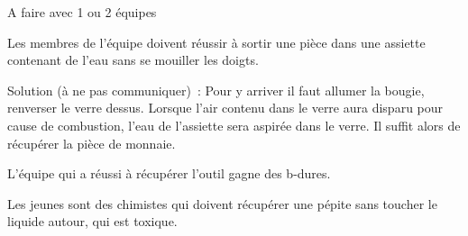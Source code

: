 \documentclass{grand-jeu}
\begin{document}
\begin{liste-materiel}
\end{liste-materiel}

\begin{regles}
A faire avec 1 ou 2 équipes

Les membres de l’équipe doivent réussir à sortir une pièce dans une assiette contenant de l’eau sans se mouiller les doigts.

Solution (à ne pas communiquer) : Pour y arriver il faut allumer la bougie, renverser le verre dessus. Lorsque l’air contenu dans le verre aura disparu pour cause de combustion, l’eau de l’assiette sera aspirée dans le verre. Il suffit alors de récupérer la pièce de monnaie.

L’équipe qui a réussi à récupérer l’outil gagne des b-dures.
\end{regles}

\begin{imaginaire}
Les jeunes sont des chimistes qui doivent récupérer une pépite sans toucher le liquide autour, qui est toxique.
\end{imaginaire}

\begin{moments-stop}
\end{moments-stop}
\end{document}
